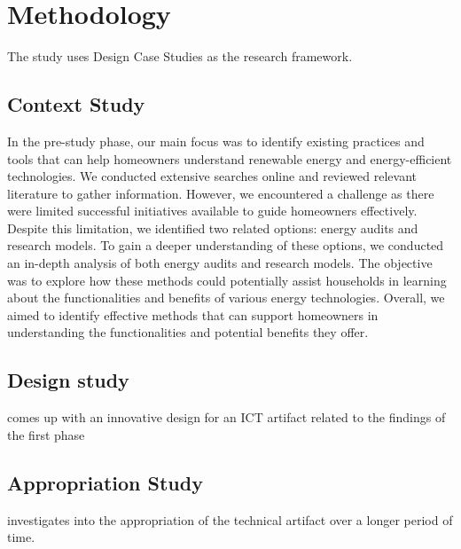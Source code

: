 \chapter{Methodology} 

The study uses Design Case Studies \cite{dcs} as the research framework. 


\section{Context Study}

In the pre-study phase, 
our main focus was to identify existing practices and tools that can help homeowners understand renewable energy and energy-efficient technologies.
We conducted extensive searches online and reviewed relevant literature to gather information. 
However, we encountered a challenge as there were limited successful initiatives available to guide homeowners effectively.
Despite this limitation, we identified two related options: energy audits and research models. 
To gain a deeper understanding of these options, we conducted an in-depth analysis of both energy audits and research models. 
The objective was to explore how these methods could potentially assist households in learning about the functionalities and benefits of various energy technologies.
Overall, we aimed to identify effective methods that can support homeowners in understanding the functionalities and potential benefits they offer.


\section{Design study}

comes up with an innovative design for an ICT artifact related to the findings of the first phase


\section{Appropriation Study}

investigates into the appropriation of the technical artifact over a longer period of time. 

